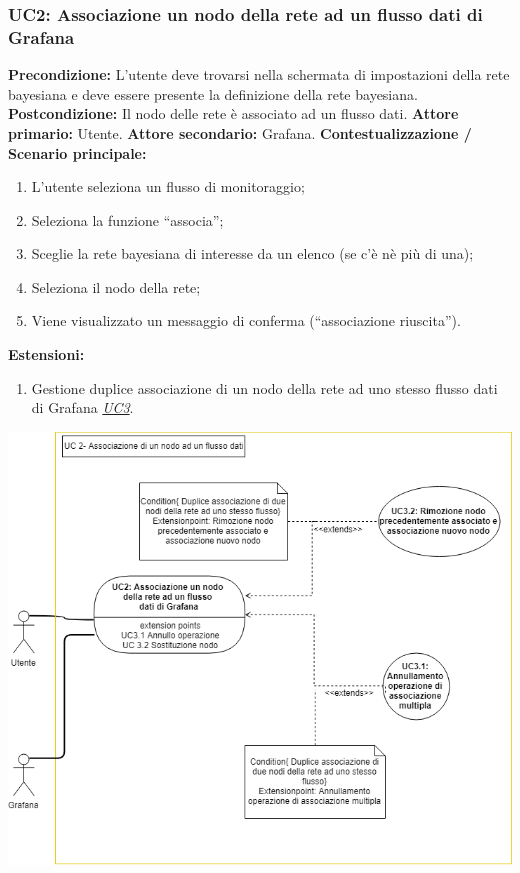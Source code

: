                 \subsubsection{UC2: Associazione un nodo della rete ad un flusso dati di Grafana}
                    \textbf{Precondizione:}   L’utente deve trovarsi nella schermata di impostazioni della rete bayesiana e deve essere presente la definizione della rete bayesiana.
                    \newline
                    \textbf{Postcondizione:} Il nodo delle rete è associato ad un flusso dati.
                    \newline
                    \textbf{Attore primario:} Utente.
                    \newline
                    \textbf{Attore secondario:} Grafana.
                    \newline
                    \textbf{Contestualizzazione / Scenario principale:} \begin{enumerate}
                        \item L’utente seleziona un flusso di monitoraggio;
                        \item Seleziona la funzione “associa”;
                        \item Sceglie la rete bayesiana di interesse da un elenco (se c’è nè più di una);
                        \item Seleziona il nodo della rete;
                        \item Viene visualizzato un messaggio di conferma (“associazione riuscita”).
                    \end{enumerate}
                    
                    \textbf{Estensioni:} \begin{enumerate}
                            \item Gestione duplice associazione di un nodo della rete ad uno stesso flusso dati di Grafana \underline{\textit{UC3}}.
                        \end{enumerate}
                
                \includegraphics[width=\textwidth]{UC2.png}
                
